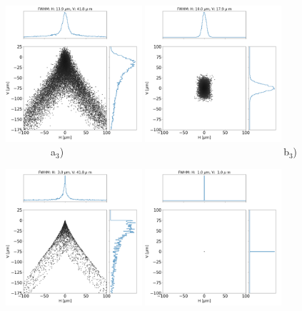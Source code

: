 \documentclass[]{article}
\begin{document}
\begin{figure}
\includegraphics[width=0.45\textwidth]{figures/alsu_toroid.png}
\includegraphics[width=0.45\textwidth]{figures/alsu_diaboloid.png} \\

\flushleft
~~~~~~~~~a$_3$)~~~~~~~~~~~~~~~~~~~~~~~~~~~~~~~~~~~~~~~~~~~~b$_3$) \\
\centering

\includegraphics[width=0.45\textwidth]{figures/bl_point_toroid.png} 
\includegraphics[width=0.45\textwidth]{figures/bl_point_diaboloid-exact.png}  \\
\end{figure}

\end{document}
